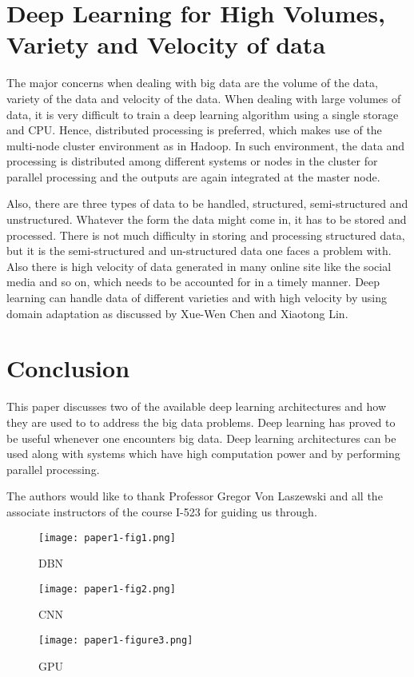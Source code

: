 \documentclass[sigconf]{acmart}
\begin{document}
\section{Deep Learning for High Volumes, Variety and Velocity of data}
The major concerns when dealing with big data are the volume of the data, variety of the data and velocity of the data. When dealing with large volumes of data, it is very difficult to train a deep learning algorithm using a single storage and CPU. Hence, distributed processing is preferred, which makes use of the multi-node cluster environment as in Hadoop. In such environment, the data and processing is distributed among different systems or nodes in the cluster for parallel processing and the outputs are again integrated at the master node.

Also, there are three types of data to be handled, structured, semi-structured and unstructured. Whatever the form the data might come in, it has to be stored and processed. There is not much difficulty in storing and processing structured data, but it is the semi-structured and un-structured data one faces a problem with. Also there is high velocity of data generated in many online site like the social media and so on, which needs to be accounted for in a timely manner. Deep learning can handle data of different varieties and with high velocity by using domain adaptation as discussed by Xue-Wen Chen and Xiaotong Lin.\cite{Chen2014}

\section{Conclusion}
This paper discusses two of the available deep learning architectures and how they are used to to address the big data problems. Deep learning has proved to be useful whenever one encounters big data. Deep learning architectures can be used along with systems which have high computation power and by performing parallel processing. 

\begin{acks}

  The authors would like to thank Professor Gregor Von Laszewski and all the associate instructors of the course I-523 for guiding us through.
\end{acks}





\begin{figure}[htp]
\centering
\texttt{[image: paper1-fig1.png]}
\caption{DBN}
\label{fig:1}
\end{figure}

\begin{figure}[htp]
\centering
\texttt{[image: paper1-fig2.png]}
\caption{CNN}
\label{fig:2}
\end{figure}

\begin{figure}[htp]
\centering
\texttt{[image: paper1-figure3.png]}
\caption{GPU}
\label{fig:3}
\end{figure}
\end{document}
